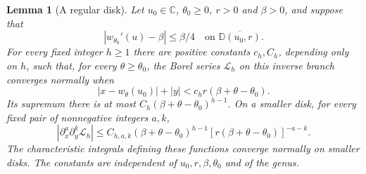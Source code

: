 \documentclass[a4paper,10pt]{article}
\numberwithin{equation}{section}
\theoremstyle{paperplain}
\newtheorem{lmm}[thm]{Lemma}
\theoremstyle{paperremark}
\theoremstyle{paperplain}
\begin{document}
\begin{lmm}[A regular disk]\label{lmm:b:regular-disk}
Let $u_0\in\mathbb C$, $\theta_0\geq0$, $r>0$ and $\beta>0$,
and suppose that
\begin{equation}\label{eq:b:regular-hypothesis}
 |w_{\theta_0}'(u)-\beta|\leq\beta/4
                  \quad\text{on }\overline{\mathbb D(u_0,r)}.
\end{equation}
For every fixed integer $h\geq1$ there are positive constants
$c_h,C_h$, depending only on $h$, such that, for every
$\theta\geq\theta_0$, the Borel series $\mathcal L_h$ on this
inverse branch converges normally when
\begin{equation}\label{eq:b:regular-disk}
 |x-w_\theta(u_0)|+|y|
                  <c_h r(\beta+\theta-\theta_0).
\end{equation}
Its supremum there is at most
$C_h(\beta+\theta-\theta_0)^{h-1}$. On a smaller disk, for every
fixed pair of nonnegative integers $a,k$,
\begin{equation}\label{eq:b:regular-derivatives}
 |\partial_x^a\partial_y^k\mathcal L_h|
 \leq C_{h,a,k}(\beta+\theta-\theta_0)^{h-1}
                  [r(\beta+\theta-\theta_0)]^{-a-k}.
\end{equation}
The characteristic integrals defining these functions converge
normally on smaller disks. The constants are independent of
$u_0,r,\beta,\theta_0$ and of the genus.
\end{lmm}
\end{document}
